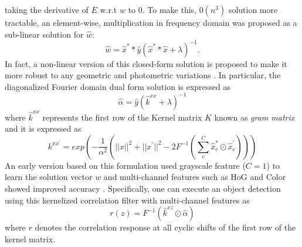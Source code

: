 \documentclass{bmvc2k}
\begin{document}
taking the derivative of $E$ w.r.t $w$ to $0$. To make this,
$\mathcal{0}(n^{3})$ solution more tractable, an element-wise,
multiplication in frequency domain was proposed as a sub-linear
solution for $\hat{w}$:
\begin{equation}
\hat{w} = \hat{x}^{*}*\hat{y}(\hat{x}^{*}*\hat{x}+\lambda)^{-1}.
\label{eq:DiagonalizedPrimalSolution}
\end{equation}
In fact, a non-linear version of this closed-form solution is proposed
to make it more robust to any geometric and photometric variations
\cite{henriques2015high}. In particular, the diagonalized Fourier
domain dual form solution is expressed as
\begin{equation}
\hat{\alpha} = \hat{y}(\hat{k}^{xx}+\lambda)^{-1}
\label{eq:FourierDualDomainSolution}
\end{equation}
where $\hat{k}^{xx}$ represents the first row of the Kernel matrix $K$
known as \textit{gram matrix} and it is expressed as
\begin{equation}
k^{xx^{'}} = exp(-\dfrac{1}{\alpha^{2}}(||x||^{2}+||x^{'}||^{2}-2F^{-1}(\sum^{C}_{c}\hat{x}_{c}^{*}\odot \hat{x}_{c}^{'})))
\label{eq:GaussianCorrelationSingleChannel}
\end{equation}
An early version based on this formulation used grayscale feature
($C=1$) to learn the solution vector $w$ and multi-channel features
such as HoG and Color showed improved accuracy
\cite{henriques2015high,galoogahi2013multi,tang2015multi,ma2015long,bibi2015multi}. Specifically,
one can execute an object detection using this kernelized correlation
filter with multi-channel features as 
\begin{equation}
r(z) = F^{-1}(\hat{k}^{xz} \odot \hat{\alpha})
\end{equation}
where $r$ denotes the correlation response at all cyclic shifts of the
first row of the kernel matrix.
\end{document}
